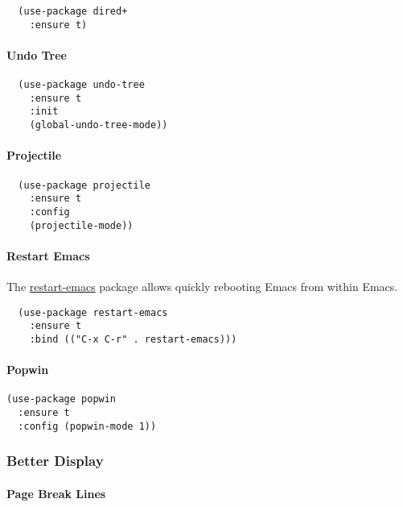 \documentclass[11pt]{article}
\begin{document}
\begin{verbatim}
  (use-package dired+
    :ensure t)
\end{verbatim}

\paragraph*{Undo Tree}
\label{sec:org05eb28a}

\begin{verbatim}
  (use-package undo-tree
    :ensure t
    :init
    (global-undo-tree-mode))
\end{verbatim}

\paragraph*{Projectile}
\label{sec:org23de8c6}

\begin{verbatim}
  (use-package projectile
    :ensure t
    :config
    (projectile-mode))
\end{verbatim}

\paragraph*{Restart Emacs}
\label{sec:orgf45ed26}

The \href{https://github.com/iqbalansari/restart-emacs}{restart-emacs} package allows quickly rebooting Emacs
from within Emacs.

\begin{verbatim}
  (use-package restart-emacs
    :ensure t
    :bind (("C-x C-r" . restart-emacs)))
\end{verbatim}

\paragraph*{Popwin}
\label{sec:org3d05537}

\begin{verbatim}
(use-package popwin
  :ensure t
  :config (popwin-mode 1))
\end{verbatim}

\subsubsection*{Better Display}
\label{sec:org2d5f6cc}
\paragraph*{Page Break Lines}
\label{sec:orgafc7128}
\end{document}
